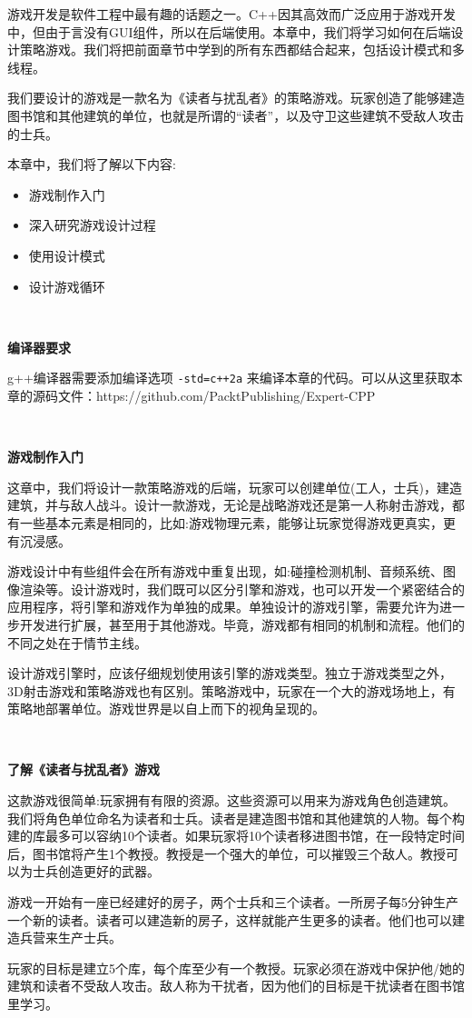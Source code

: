 游戏开发是软件工程中最有趣的话题之一。C++因其高效而广泛应用于游戏开发中，但由于言没有GUI组件，所以在后端使用。本章中，我们将学习如何在后端设计策略游戏。我们将把前面章节中学到的所有东西都结合起来，包括设计模式和多线程。 \par
我们要设计的游戏是一款名为《读者与扰乱者》的策略游戏。玩家创造了能够建造图书馆和其他建筑的单位，也就是所谓的“读者”，以及守卫这些建筑不受敌人攻击的士兵。 \par
本章中，我们将了解以下内容: \par

\begin{itemize}
	\item 游戏制作入门
	\item 深入研究游戏设计过程
	\item 使用设计模式
	\item 设计游戏循环
\end{itemize}

\noindent\textbf{}\ \par
\textbf{编译器要求} \ \par
g++编译器需要添加编译选项 \texttt{-std=c++2a} 来编译本章的代码。可以从这里获取本章的源码文件：https:/​/github.​com/PacktPublishing/Expert-CPP \par

\noindent\textbf{}\ \par
\textbf{游戏制作入门} \ \par
这章中，我们将设计一款策略游戏的后端，玩家可以创建单位(工人，士兵)，建造建筑，并与敌人战斗。设计一款游戏，无论是战略游戏还是第一人称射击游戏，都有一些基本元素是相同的，比如:游戏物理元素，能够让玩家觉得游戏更真实，更有沉浸感。 \par
游戏设计中有些组件会在所有游戏中重复出现，如:碰撞检测机制、音频系统、图像渲染等。设计游戏时，我们既可以区分引擎和游戏，也可以开发一个紧密结合的应用程序，将引擎和游戏作为单独的成果。单独设计的游戏引擎，需要允许为进一步开发进行扩展，甚至用于其他游戏。毕竟，游戏都有相同的机制和流程。他们的不同之处在于情节主线。 \par
设计游戏引擎时，应该仔细规划使用该引擎的游戏类型。独立于游戏类型之外，3D射击游戏和策略游戏也有区别。策略游戏中，玩家在一个大的游戏场地上，有策略地部署单位。游戏世界是以自上而下的视角呈现的。 \par

\noindent\textbf{}\ \par
\textbf{了解《读者与扰乱者》游戏} \ \par
这款游戏很简单:玩家拥有有限的资源。这些资源可以用来为游戏角色创造建筑。我们将角色单位命名为读者和士兵。读者是建造图书馆和其他建筑的人物。每个构建的库最多可以容纳10个读者。如果玩家将10个读者移进图书馆，在一段特定时间后，图书馆将产生1个教授。教授是一个强大的单位，可以摧毁三个敌人。教授可以为士兵创造更好的武器。 \par
游戏一开始有一座已经建好的房子，两个士兵和三个读者。一所房子每5分钟生产一个新的读者。读者可以建造新的房子，这样就能产生更多的读者。他们也可以建造兵营来生产士兵。 \par
玩家的目标是建立5个库，每个库至少有一个教授。玩家必须在游戏中保护他/她的建筑和读者不受敌人攻击。敌人称为干扰者，因为他们的目标是干扰读者在图书馆里学习。 \par

